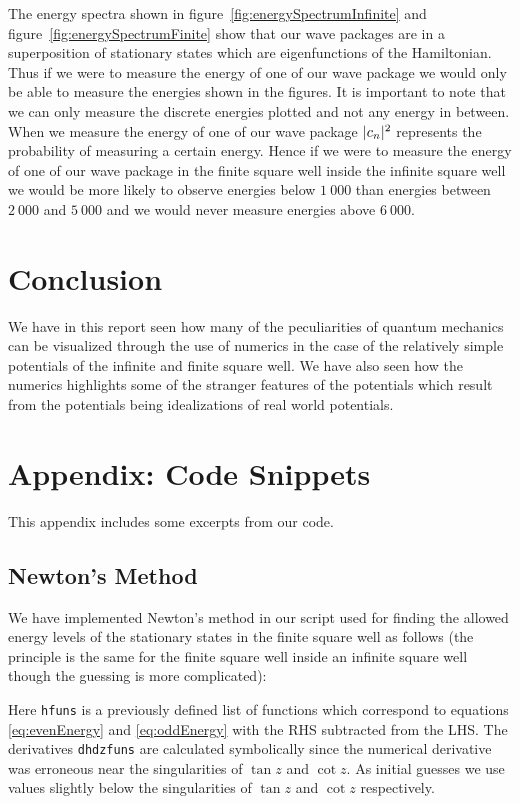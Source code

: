 \documentclass[12pt,a4paper]{article}
\DeclarePairedDelimiter{\abs}{\lvert}{\rvert}
\begin{document}
The energy spectra shown in figure~\ref{fig:energySpectrumInfinite} and figure~\ref{fig:energySpectrumFinite} show that our wave packages are in a superposition of stationary states which are eigenfunctions of the Hamiltonian. Thus if we were to measure the energy of one of our wave package we would only be able to measure the energies shown in the figures. It is important to note that we can only measure the discrete energies plotted and not any energy in between. When we measure the energy of one of our wave package $\abs{c_n}^2$ represents the probability of measuring a certain energy. Hence if we were to measure the energy of one of our wave package in the finite square well inside the infinite square well we would be more likely to observe energies below $1~000$ than energies between $2~000$ and $5~000$ and we would never measure energies above $6~000$.

\section{Conclusion}
We have in this report seen how many of the peculiarities of quantum mechanics can be visualized through the use of numerics in the case of the relatively simple potentials of the infinite and finite square well. We have also seen how the numerics highlights some of the stranger features of the potentials which result from the potentials being idealizations of real world potentials.

\newpage
\appendix
\section{Appendix: Code Snippets}
This appendix includes some excerpts from our code.
\subsection{Newton's Method} \label{app:newton}
We have implemented Newton's method in our script used for finding the allowed energy levels of the stationary states in the finite square well as follows (the principle is the same for the finite square well inside an infinite square well though the guessing is more complicated):

Here \lstinline{hfuns} is a previously defined list of functions which correspond to equations \eqref{eq:evenEnergy} and \eqref{eq:oddEnergy} with the RHS subtracted from the LHS. The derivatives \lstinline{dhdzfuns} are calculated symbolically since the numerical derivative was erroneous near the singularities of $\tan z$ and $\cot z$. As initial guesses we use values slightly below the singularities of $\tan z$ and $\cot z$ respectively.
\end{document}
